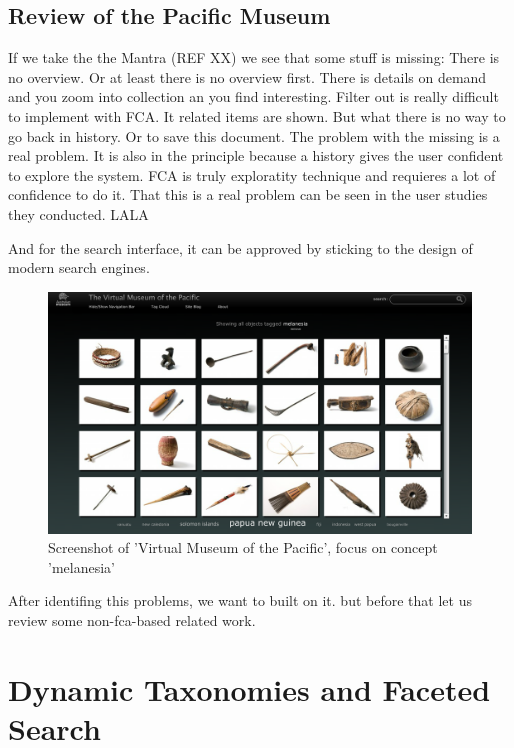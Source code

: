 \documentclass[11pt]{report}
\begin{document}
 \subsection{Review of the Pacific Museum}
 
 If we take the the Mantra (REF XX) we see that some stuff is missing: There is no overview. Or at least there is no overview first. There is details on demand and you zoom into collection an you find interesting. Filter out is really difficult to implement with FCA. It related items are shown. But what there is no way to go back in history. Or to save this document. The problem with the missing is a real problem. It is also in the principle because a history gives the user confident to explore the system. FCA is truly exploratity technique and requieres a lot of confidence to do it. That this is a real problem can be seen in the user studies they conducted. LALA
 
 And for the search interface, it can be approved by sticking to the design of modern search engines.
 
 \begin{figure}[h]
\label{figure:pacific}
	\centering
	\includegraphics[width=\linewidth]{images/pacific}
\caption{Screenshot of 'Virtual Museum of the Pacific', focus on concept 'melanesia'}
\end{figure}
 
 

 
 After identifing this problems, we want to built on it. but before that let us review some non-fca-based related work.


\section{Dynamic Taxonomies and Faceted Search}
\label{dyafs}
\end{document}
